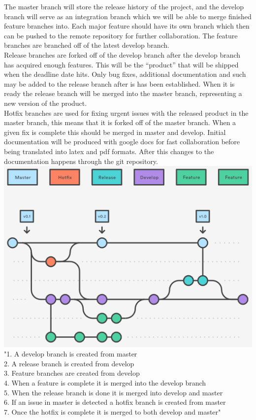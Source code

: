 \documentclass[12pt]{article}%
\begin{document}
The master branch will store the release history of the project, and the develop 		branch will serve as an integration branch which we will be able to merge finished 	feature branches into. Each major feature should have its own branch which then can be pushed to the remote repository for further collaboration. The feature branches are branched off of the latest develop branch. \\
Release branches are forked off of the develop branch after the develop branch has acquired enough features. This will be the “product” that will be shipped when the deadline date hits. Only bug fixes, additional documentation and such may be added to the release branch after is has been established. When it is ready the release branch will be merged into the master branch, representing a new version of the product. \\
Hotfix branches are used for fixing urgent issues with the released product in the master branch, this means that it is forked off of the master branch. When a given fix is complete this should be merged in master and develop.
Initial documentation will be produced with google docs for fast collaboration before being translated into latex and pdf formats. After this changes to the documentation happens through the git repository. \\

\includegraphics[scale=0.8]{image12.png} \\

\noindent
"1. A develop branch is created from master\\
2. A release branch is created from develop\\
3. Feature branches are created from develop\\
4. When a feature is complete it is merged into the develop branch\\
5. When the release branch is done it is merged into develop and master\\
6. If an issue in master is detected a hotfix branch is created from master\\
7. Once the hotfix is complete it is merged to both develop and master"\\
\end{document}
